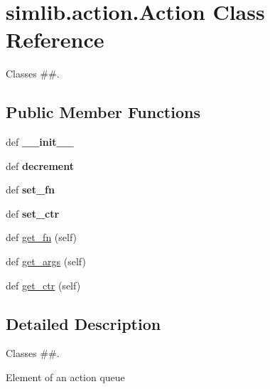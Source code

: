 \hypertarget{classsimlib_1_1action_1_1_action}{}\section{simlib.\+action.\+Action Class Reference}
\label{classsimlib_1_1action_1_1_action}


Classes \#\#.  


\subsection*{Public Member Functions}
\begin{DoxyCompactItemize}
\item 
\mbox{\label{classsimlib_1_1action_1_1_action_a9f85fbf1e0a4249eb884a10408e61583}} 
def {\bfseries \+\_\+\+\_\+init\+\_\+\+\_\+}
\item 
\mbox{\label{classsimlib_1_1action_1_1_action_ade5a713fac538d1c6c2db749e45368d4}} 
def {\bfseries decrement}
\item 
\mbox{\label{classsimlib_1_1action_1_1_action_a7208f5d6452283fe610143e5b0786f2b}} 
def {\bfseries set\+\_\+fn}
\item 
\mbox{\label{classsimlib_1_1action_1_1_action_a5043b6debec6f1486a449b0393351353}} 
def {\bfseries set\+\_\+ctr}
\item 
def \mbox{\hyperlink{classsimlib_1_1action_1_1_action_ab9a687eb0392442ddf3ea24216115eab}{get\+\_\+fn}} (self)
\item 
def \mbox{\hyperlink{classsimlib_1_1action_1_1_action_a50ced713bcfa576f7177455b4b1d6d33}{get\+\_\+args}} (self)
\item 
def \mbox{\hyperlink{classsimlib_1_1action_1_1_action_a9d3d09c4547aa4bb649f1ccc168ebd3b}{get\+\_\+ctr}} (self)
\end{DoxyCompactItemize}


\subsection{Detailed Description}
Classes \#\#. 

\begin{DoxyVerb}Element of an action queue
\end{DoxyVerb}
 

